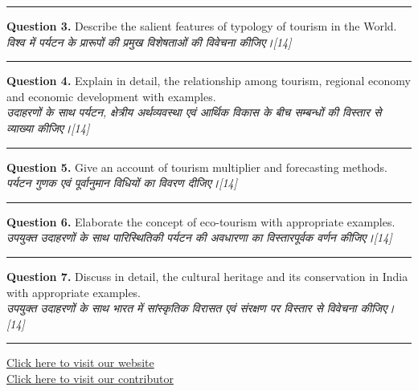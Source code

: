 \documentclass[11pt,a4paper]{article}
\newcommand{\pts}[1]{\hfill   \textit{[#1]}}
\begin{document}
\medskip\rule{\linewidth}{0.2pt}\medskip




\noindent   \textbf{Question 3.} Describe the salient features of typology of tourism in the World.\\
   \textit{विश्व में पर्यटन के प्रारूपों की प्रमुख विशेषताओं की विवेचना कीजिए।}\pts{14}

\medskip\rule{\linewidth}{0.2pt}\medskip




\noindent   \textbf{Question 4.} Explain in detail, the relationship among tourism, regional economy and economic development with examples.\\
   \textit{उदाहरणों के साथ पर्यटन, क्षेत्रीय अर्थव्यवस्था एवं आर्थिक विकास के बीच सम्बन्धों की विस्तार से व्याख्या कीजिए।}\pts{14}

\medskip\rule{\linewidth}{0.2pt}\medskip




\noindent   \textbf{Question 5.} Give an account of tourism multiplier and forecasting methods.\\
   \textit{पर्यटन गुणक एवं पूर्वानुमान विधियों का विवरण दीजिए।}\pts{14}

\medskip\rule{\linewidth}{0.2pt}\medskip




\noindent   \textbf{Question 6.} Elaborate the concept of eco-tourism with appropriate examples.\\
   \textit{उपयुक्त उदाहरणों के साथ पारिस्थितिकी पर्यटन की अवधारणा का विस्तारपूर्वक वर्णन कीजिए।}\pts{14}

\medskip\rule{\linewidth}{0.2pt}\medskip




\noindent   \textbf{Question 7.} Discuss in detail, the cultural heritage and its conservation in India with appropriate examples.\\
   \textit{उपयुक्त उदाहरणों के साथ भारत में सांस्कृतिक विरासत एवं संरक्षण पर विस्तार से विवेचना कीजिए।}\pts{14}

\vfill
\rule{\linewidth}{0.4pt}

\begin{center}\small
\href{https://bhu-exam.vercel.app/}{Click here to visit our website}\\[4pt]
\href{https://me-aryan.vercel.app/}{Click here to visit our contributor}
\end{center}
\end{document}
